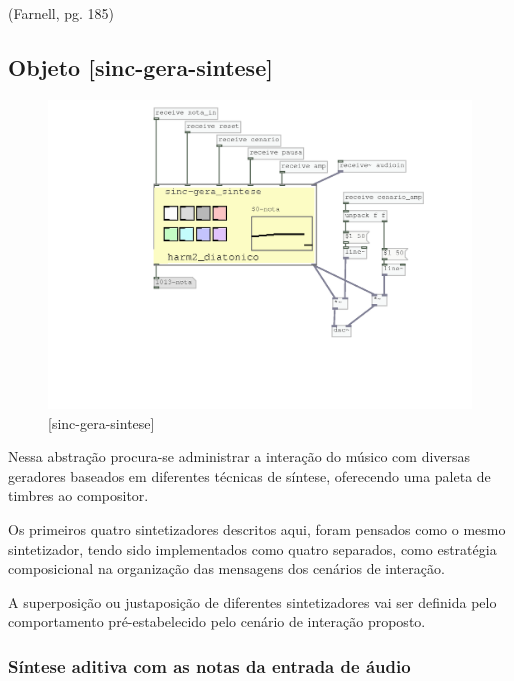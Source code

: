 \documentclass[draft]{ppgmus}
\begin{document}
(Farnell, pg. 185)


\subsection{ Objeto [sinc-gera-sintese]}


\begin{figure}
\includegraphics[scale=.6]{sinc-gera-sintese}
\caption{[sinc-gera-sintese]}
\label{sincgerasintese}
\end{figure}



Nessa abstração procura-se administrar a interação do músico
com diversas geradores baseados em diferentes técnicas de síntese,
oferecendo uma paleta de timbres ao compositor.

Os primeiros quatro sintetizadores descritos aqui, foram pensados como o mesmo
sintetizador, tendo sido implementados como quatro separados, como estratégia
composicional na organização das mensagens dos cenários de interação.




A superposição ou justaposição de diferentes sintetizadores vai
ser definida pelo comportamento pré-estabelecido pelo cenário de interação
proposto.





\subsubsection{Síntese aditiva com as notas da entrada de áudio}
\end{document}
